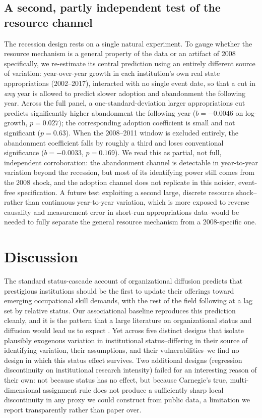 \documentclass[11pt, letterpaper]{article}
\newcommand{\parencite}[1]{\cite{#1}}
\begin{document}
\subsection*{A second, partly independent test of the resource channel}

The recession design rests on a single natural experiment. To gauge whether the resource mechanism is a general property of the data or an artifact of 2008 specifically, we re-estimate its central prediction using an entirely different source of variation: year-over-year growth in each institution's own real state appropriations (2002--2017), interacted with no single event date, so that a cut in \emph{any} year is allowed to predict slower adoption and abandonment the following year. Across the full panel, a one-standard-deviation larger appropriations cut predicts significantly higher abandonment the following year ($b=-0.0046$ on log-growth, $p=0.027$); the corresponding adoption coefficient is small and not significant ($p=0.63$). When the 2008--2011 window is excluded entirely, the abandonment coefficient falls by roughly a third and loses conventional significance ($b=-0.0033$, $p=0.169$). We read this as partial, not full, independent corroboration: the abandonment channel is detectable in year-to-year variation beyond the recession, but most of its identifying power still comes from the 2008 shock, and the adoption channel does not replicate in this noisier, event-free specification. A future test exploiting a second large, discrete resource shock--rather than continuous year-to-year variation, which is more exposed to reverse causality and measurement error in short-run appropriations data--would be needed to fully separate the general resource mechanism from a 2008-specific one.

\section*{Discussion}

The standard status-cascade account of organizational diffusion predicts that prestigious institutions should be the first to update their offerings toward emerging occupational skill demands, with the rest of the field following at a lag set by relative status. Our associational baseline reproduces this prediction cleanly, and it is the pattern that a large literature on organizational status and diffusion would lead us to expect \parencite{podolny1993, phillipszuckerman2001, clauset2015}. Yet across five distinct designs that isolate plausibly exogenous variation in institutional status--differing in their source of identifying variation, their assumptions, and their vulnerabilities--we find no design in which this status effect survives. Two additional designs (regression discontinuity on institutional research intensity) failed for an interesting reason of their own: not because status has no effect, but because Carnegie's true, multi-dimensional assignment rule does not produce a sufficiently sharp local discontinuity in any proxy we could construct from public data, a limitation we report transparently rather than paper over.
\end{document}
